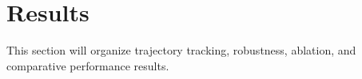 \section{Results}

This section will organize trajectory tracking, robustness, ablation, and comparative performance results.
